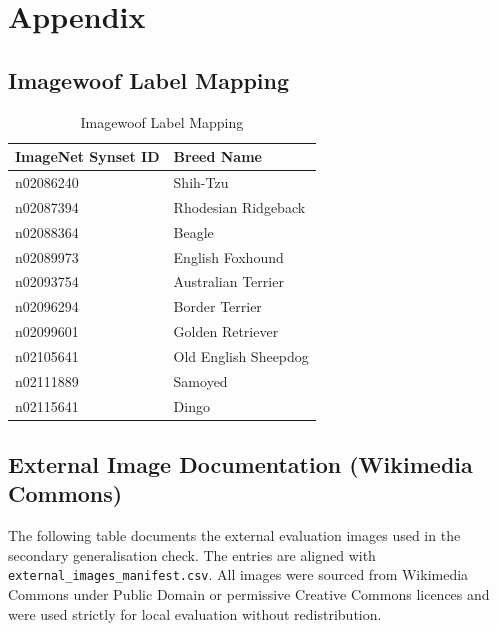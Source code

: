 \documentclass[12pt, a4paper]{article}
\begin{document}



\appendix

\section{Appendix}

\subsection{Imagewoof Label Mapping}

\begin{table}[htbp]
  \centering
  \caption{Imagewoof Label Mapping}
  \begin{tabular}{ll}
    \toprule
    ImageNet Synset ID & Breed Name           \\
    \midrule
    n02086240          & Shih-Tzu             \\
    n02087394          & Rhodesian Ridgeback  \\
    n02088364          & Beagle               \\
    n02089973          & English Foxhound     \\
    n02093754          & Australian Terrier   \\
    n02096294          & Border Terrier       \\
    n02099601          & Golden Retriever     \\
    n02105641          & Old English Sheepdog \\
    n02111889          & Samoyed              \\
    n02115641          & Dingo                \\
    \bottomrule
  \end{tabular}
\end{table}

\subsection{External Image Documentation (Wikimedia Commons)}

The following table documents the external evaluation images used in the secondary generalisation check. The entries are aligned with \texttt{external\_images\_manifest.csv}. All images were sourced from Wikimedia Commons under Public Domain or permissive Creative Commons licences and were used strictly for local evaluation without redistribution.
\end{document}
